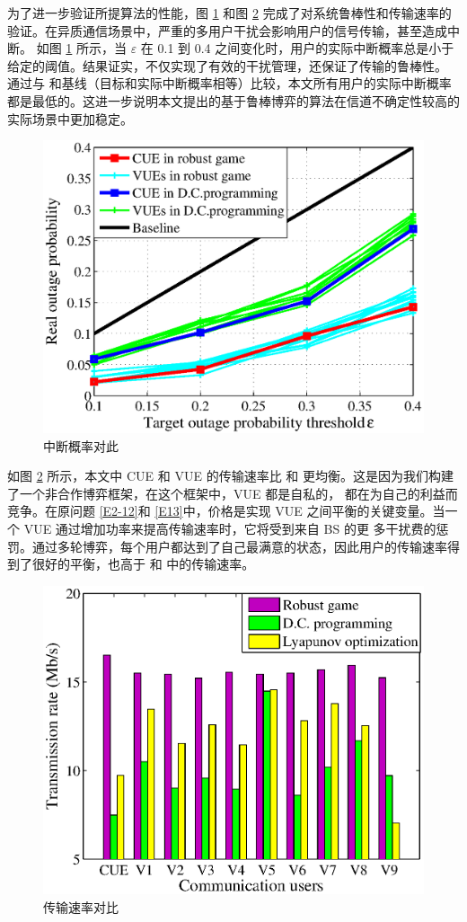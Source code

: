 为了进一步验证所提算法的性能，图 \ref{F4} 和图 \ref{F5} 完成了对系统鲁棒性和传输速率的验证。在异质通信场景中，严重的多用户干扰会影响用户的信号传输，甚至造成中断。
如图 \ref{F4} 所示，当 $\varepsilon$ 在 0.1 到 0.4 之间变化时，用户的实际中断概率总是小于给定的阈值。结果证实，不仅实现了有效的干扰管理，还保证了传输的鲁棒性。
通过与 \cite{PCID}和基线（目标和实际中断概率相等）比较，本文所有用户的实际中断概率都是最低的。这进一步说明本文提出的基于鲁棒博弈的算法在信道不确定性较高的实际场景中更加稳定。
\begin{figure}[H]
\centering
\includegraphics[width=12cm]{figures//chap2//4.eps}
\caption{中断概率对此}
\label{F4}
\end{figure}

如图 \ref{F5} 所示，本文中 CUE 和 VUE 的传输速率比 \cite{PCID}和 \cite{ACAR}更均衡。这是因为我们构建了一个非合作博弈框架，在这个框架中，VUE 都是自私的，
都在为自己的利益而竞争。在原问题 \eqref{E2-12}和 \eqref{E13}中，价格是实现 VUE 之间平衡的关键变量。当一个 VUE 通过增加功率来提高传输速率时，它将受到来自 BS 的更
多干扰费的惩罚。通过多轮博弈，每个用户都达到了自己最满意的状态，因此用户的传输速率得到了很好的平衡，也高于 \cite{PCID}和 \cite{ACAR}中的传输速率。
\begin{figure}[H]
\centering
\includegraphics[width=12cm]{figures//chap2//5.eps}
\caption{传输速率对比}
\label{F5}
\end{figure}

